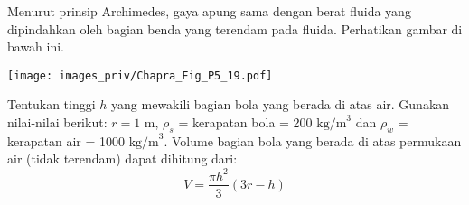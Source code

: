 \begin{soal}
Menurut prinsip Archimedes, gaya apung sama dengan berat fluida yang dipindahkan
oleh bagian benda yang terendam pada fluida.
Perhatikan gambar di bawah ini.

{\centering
\texttt{[image: images\_priv/Chapra\_Fig\_P5\_19.pdf]}
\par}

Tentukan tinggi $h$ yang mewakili bagian bola yang berada di atas air.
Gunakan nilai-nilai berikut: $r=1$ m, $\rho_{s}$ = kerapatan bola =
200 $\mathrm{kg/m}^{3}$ dan $\rho_{w}$ = kerapatan air = 1000 $\mathrm{kg/m}^{3}$.
Volume bagian bola yang berada di atas permukaan air (tidak terendam) dapat dihitung dari:
\begin{equation*}
V = \frac{\pi h^2}{3} (3r - h)
\end{equation*}
\end{soal}